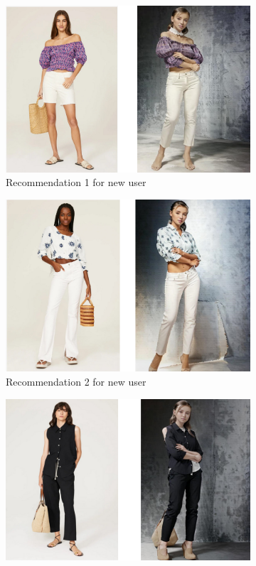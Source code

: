 \documentclass[conference]{IEEEtran}
\begin{document}
\begin{figure}[!htbp]
  \centering
  \begin{subfigure}[b]{0.5\textwidth}
    \centering
    \includegraphics[width=\textwidth]{Picture1.png}
    \caption{Recommendation 1 for new user }
    \label{fig:Recommendations1}
  \end{subfigure}
  \hfill
  \begin{subfigure}[b]{0.5\textwidth}
    \centering
    \includegraphics[width=\textwidth]{Picture2.png}
    \caption{Recommendation 2 for new user}
    \label{fig:Recommendations2}
  \end{subfigure}
  \hfill
  \begin{subfigure}[b]{0.5\textwidth}
    \centering
    \includegraphics[width=\textwidth]{Picture3.png}

\end{subfigure}
\end{figure}
\end{document}
